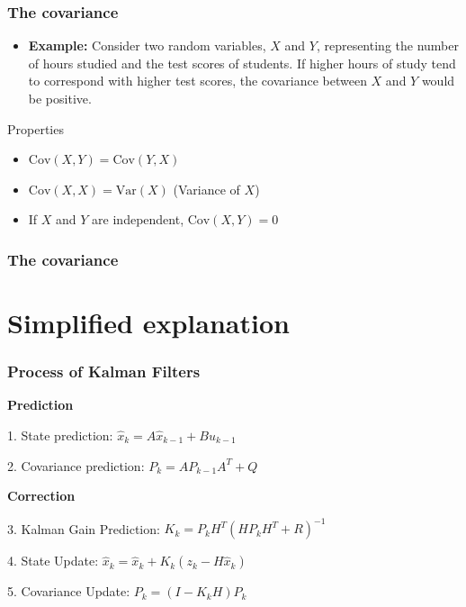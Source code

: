 \documentclass{beamer}
\begin{document}
\begin{frame}
    \frametitle{The covariance}
    \begin{itemize}
        \item \textbf{Example:}
        Consider two random variables, \(X\) and \(Y\), representing the number of hours studied and the test scores of students. If higher hours of study tend to correspond with higher test scores, the covariance between \(X\) and \(Y\) would be positive.
    \end{itemize}

    \begin{block}{Properties}
        \begin{itemize}
            \item \(\text{Cov}(X, Y) = \text{Cov}(Y, X)\)
            \item \(\text{Cov}(X, X) = \text{Var}(X)\) (Variance of \(X\))
            \item If \(X\) and \(Y\) are independent, \(\text{Cov}(X, Y) = 0\)
        \end{itemize}
    \end{block}

\end{frame}

\begin{frame}
    \frametitle{The covariance}
\end{frame}

\section{Simplified explanation}

\begin{frame}
    \frametitle{Process of Kalman Filters}

    \textbf{Prediction}

    1. State prediction: \( \hat{x}_{k} = A\hat{x}_{k-1}+Bu_{k-1} \)

    2. Covariance prediction: \( P_{k}=AP_{k-1}A^{T}+Q \)

    \textbf{Correction}

    3. Kalman Gain Prediction: \( K_{k}=P_{k}H^{T}(HP_{k}H^T+R)^{-1} \)

    4. State Update: \( \hat{x}_{k}=\hat{x}_{k}+K_{k}(z_{k}-H\hat{x}_{k}) \)

    5. Covariance Update: \( P_{k}=(I-K_{k}H)P_{k} \)
\end{frame}
\end{document}
